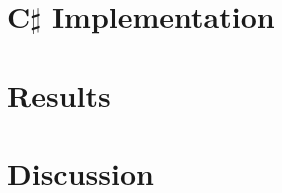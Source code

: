 \documentclass[a4paper]{article}
\begin{document}
\section{C$\sharp$ Implementation}
\label{implementation}

\section{Results}
\label{results}

\section{Discussion}
\label{discussion}





\end{document}
